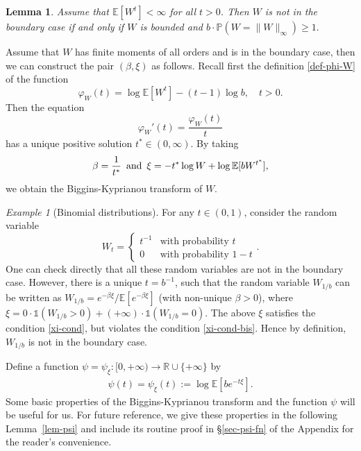 \documentclass[12pt]{amsart}
\newtheorem{lemma}[theorem]{Lemma}
\theoremstyle{definition}
\theoremstyle{remark}
\newtheorem{example}[remark]{Example}
\newcommand{\R}{\mathbb{R}}
\newcommand{\E}{\mathbb{E}}
\newcommand{\PP}{\mathbb{P}}
\newcommand{\an}{\text{\, and \,}}
\newcommand{\indi}{\mathds{1}}
\numberwithin{equation}{section}
\begin{document}
\begin{lemma}\label{lem-bdd}
 Assume that $\E[W^t]<\infty$ for all $t>0$. Then $W$ is not in the boundary case if and only if $W$ is bounded and 
$
b \cdot \PP(W= \|W\|_\infty) \ge 1. 
$
\end{lemma}
Assume that $W$ has finite moments of all orders and is in the boundary case, then we can construct the pair $(\beta, \xi)$ as follows.  Recall first the definition \eqref{def-phi-W} of the function 
\[
 \varphi_W(t)  = \log \E[W^t]-(t-1)\log b, \quad t > 0.
\]
Then   the equation 
\[
  \varphi_W'(t)  = \frac{ \varphi_W(t) }{t}
\]
 has a unique  positive solution $t^*\in(0,\infty)$. By taking 
 \begin{align}\label{def-beta}
 \beta = \frac{1}{t^*} \an \xi = -  t^* \log W + \log \E[ b W^{t^*}] ,
 \end{align}
  we obtain the Biggins-Kyprianou transform of $W$.  






\begin{example}[Binomial distributions]\label{ex-bad-boy}
For any $t \in (0,1)$,  consider the random variable 
\[
W_t = \left\{
\begin{array}{cl}
t^{-1}& \text{with probability $t$}
\\
0 & \text{with probability $1- t$}
\end{array}
\right. .
\]
One can check directly that all these random variables are not in the  boundary case. 
However, there is a unique $t = b^{-1}$, such that the random variable $W_{1/b}$ can be written as  $W_{1/b}= e^{-\beta\xi}/\E[e^{-\beta\xi}]$ (with non-unique $\beta>0$), where
$
\xi = 0 \cdot \indi(W_{1/b}>0) + (+\infty)  \cdot \indi(W_{1/b}=0).
$
The above $\xi$ satisfies the condition  \eqref{xi-cond}, but violates the condition  \eqref{xi-cond-bis}. Hence by definition, $W_{1/b}$ is not in the boundary case. 
\end{example}


















Define a function $\psi = \psi_\xi:  [0, +\infty) \rightarrow \R \cup \{+\infty\}$ by  
\begin{align}\label{def-psi}
\psi(t) = \psi_\xi(t):=\log \E[be^{-t\xi}]. 
\end{align}
Some basic properties of the Biggins-Kyprianou transform and  the function $\psi$ will be useful for us. For future reference, we give these properties in the following Lemma~\ref{lem-psi} and include its routine proof in  \S \ref{sec-psi-fn} of the  Appendix  for the reader's convenience. 
\end{document}
